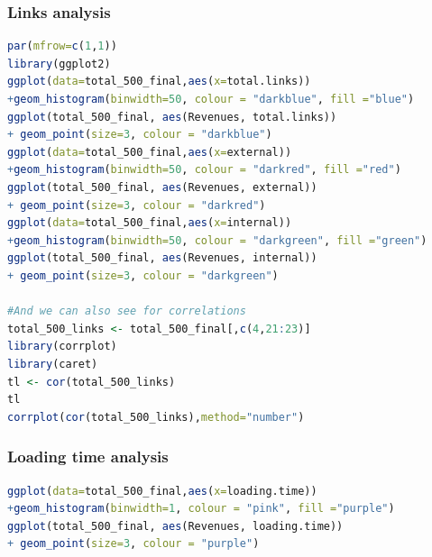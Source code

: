 \documentclass{book}
\begin{document}
\subsubsection{Links analysis}\label{r: van: l}
\begin{lstlisting}[language=R] 
par(mfrow=c(1,1))
library(ggplot2)
ggplot(data=total_500_final,aes(x=total.links))
+geom_histogram(binwidth=50, colour = "darkblue", fill ="blue")
ggplot(total_500_final, aes(Revenues, total.links)) 
+ geom_point(size=3, colour = "darkblue")
ggplot(data=total_500_final,aes(x=external))
+geom_histogram(binwidth=50, colour = "darkred", fill ="red")
ggplot(total_500_final, aes(Revenues, external)) 
+ geom_point(size=3, colour = "darkred")
ggplot(data=total_500_final,aes(x=internal))
+geom_histogram(binwidth=50, colour = "darkgreen", fill ="green")
ggplot(total_500_final, aes(Revenues, internal)) 
+ geom_point(size=3, colour = "darkgreen")

#And we can also see for correlations
total_500_links <- total_500_final[,c(4,21:23)]
library(corrplot)
library(caret)
tl <- cor(total_500_links)
tl
corrplot(cor(total_500_links),method="number")

 \end{lstlisting}
 
 
\subsubsection{Loading time analysis}\label{r: van: load}
\begin{lstlisting}[language=R] 
ggplot(data=total_500_final,aes(x=loading.time))
+geom_histogram(binwidth=1, colour = "pink", fill ="purple")
ggplot(total_500_final, aes(Revenues, loading.time)) 
+ geom_point(size=3, colour = "purple")
 \end{lstlisting}
\end{document}
